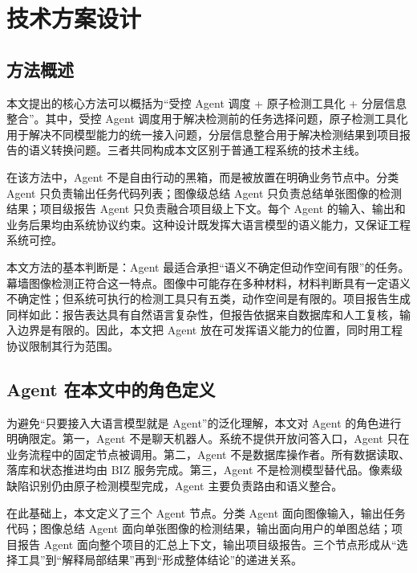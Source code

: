 \chapter{技术方案设计}
\label{chap:agent-method}

\section{方法概述}
\label{sec:method-overview}

本文提出的核心方法可以概括为“受控 Agent 调度 + 原子检测工具化 + 分层信息整合”。其中，受控 Agent 调度用于解决检测前的任务选择问题，原子检测工具化用于解决不同模型能力的统一接入问题，分层信息整合用于解决检测结果到项目报告的语义转换问题。三者共同构成本文区别于普通工程系统的技术主线。

在该方法中，Agent 不是自由行动的黑箱，而是被放置在明确业务节点中。分类 Agent 只负责输出任务代码列表；图像级总结 Agent 只负责总结单张图像的检测结果；项目级报告 Agent 只负责融合项目级上下文。每个 Agent 的输入、输出和业务后果均由系统协议约束。这种设计既发挥大语言模型的语义能力，又保证工程系统可控。

本文方法的基本判断是：Agent 最适合承担“语义不确定但动作空间有限”的任务。幕墙图像检测正符合这一特点。图像中可能存在多种材料，材料判断具有一定语义不确定性；但系统可执行的检测工具只有五类，动作空间是有限的。项目报告生成同样如此：报告表达具有自然语言复杂性，但报告依据来自数据库和人工复核，输入边界是有限的。因此，本文把 Agent 放在可发挥语义能力的位置，同时用工程协议限制其行为范围。

\section{Agent 在本文中的角色定义}
\label{sec:agent-role-definition}

为避免“只要接入大语言模型就是 Agent”的泛化理解，本文对 Agent 的角色进行明确限定。第一，Agent 不是聊天机器人。系统不提供开放问答入口，Agent 只在业务流程中的固定节点被调用。第二，Agent 不是数据库操作者。所有数据读取、落库和状态推进均由 BIZ 服务完成。第三，Agent 不是检测模型替代品。像素级缺陷识别仍由原子检测模型完成，Agent 主要负责路由和语义整合。

在此基础上，本文定义了三个 Agent 节点。分类 Agent 面向图像输入，输出任务代码；图像总结 Agent 面向单张图像的检测结果，输出面向用户的单图总结；项目报告 Agent 面向整个项目的汇总上下文，输出项目级报告。三个节点形成从“选择工具”到“解释局部结果”再到“形成整体结论”的递进关系。

